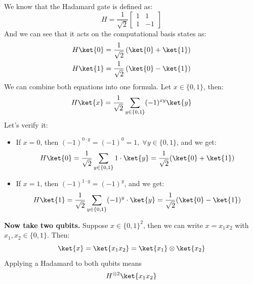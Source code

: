 \begin{remarkbox}[: Explain $H\ket{x} = \frac{1}{\sqrt{2}} \sum_{y\in\{0,1\}} (-1)^{xy}\ket{y}$]\label{rem:hadamard-formula}
    We know that the Hadamard gate is defined as:
    \begin{equation*}
        H = \frac{1}{\sqrt{2}}
        \begin{bmatrix}
            1 & 1 \\
            1 & -1
        \end{bmatrix}
    \end{equation*}
    And we can see that it acts on the computational basis states as:
    \begin{align*}
        H\ket{0} &= \frac{1}{\sqrt{2}}\left(\ket{0} + \ket{1}\right) \\
        H\ket{1} &= \frac{1}{\sqrt{2}}\left(\ket{0} - \ket{1}\right)
    \end{align*}
    We can combine both equations into one formula. Let $x \in \{0,1\}$, then:
    \begin{equation*}
        H\ket{x} = \frac{1}{\sqrt{2}} \sum_{y\in\{0,1\}} (-1)^{xy}\ket{y}
    \end{equation*}
    Let's verify it:
    \begin{itemize}
        \item If $x=0$, then $(-1)^{0\cdot y} = (-1)^0 = 1, \; \forall y \in \{0,1\}$, and we get:
            \begin{equation*}
                H\ket{0} = \frac{1}{\sqrt{2}} \sum_{y\in\{0,1\}} 1 \cdot \ket{y} = \frac{1}{\sqrt{2}} (\ket{0} + \ket{1})
            \end{equation*}
        \item If $x=1$, then $(-1)^{1\cdot y} = (-1)^y$, and we get:
            \begin{equation*}
                H\ket{1} = \frac{1}{\sqrt{2}} \sum_{y\in\{0,1\}} (-1)^y \cdot \ket{y} = \frac{1}{\sqrt{2}} (\ket{0} - \ket{1})
            \end{equation*}
    \end{itemize}
    \textcolor{Green3}{ \textbf{Now take two qubits.}} Suppose $x \in \{0,1\}^2$, then we can write $x = x_1 x_2$ with $x_1, x_2 \in \{0,1\}$. Then:
    \begin{equation*}
        \ket{x} = \ket{x_1 x_2} = \ket{x_1} \otimes \ket{x_2}
    \end{equation*}
    Applying a Hadamard to both qubits means
    \begin{equation*}
        H^{\otimes2}\ket{x_1x_2}

\end{equation*}
\end{remarkbox}
